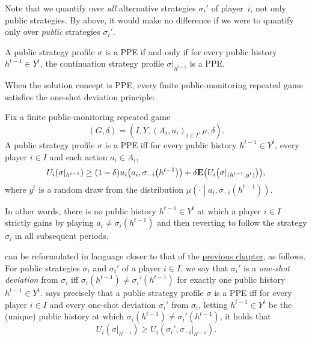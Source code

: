 Note that we quantify over \emph{all} alternative strategies $\sigma_i'$ of player~$i$, not only public strategies. By  above, it would make no difference if we were to quantify only over \emph{public} strategies $\sigma_i'$.

\begin{observation}
	\label{observation:ppe_conts}
	A public strategy profile $\sigma$ is a PPE if and only if for every public history $h^{t-1} \in Y^t$, the continuation strategy profile $\sigma|_{h^{t-1}}$ is a PPE.
\end{observation}

When the solution concept is PPE, every finite public-monitoring repeated game satisfies the one-shot deviation principle:

\begin{proposition}
	\label{proposition:ppe_osdp}
	Fix a finite public-monitoring repeated game
	\begin{equation*}
		(G,\delta) = \left( I, Y, (A_i, u_i)_{i \in I}, \mu, \delta \right) .
	\end{equation*}
	A public strategy profile $\sigma$ is a PPE iff for every public history $h^{t-1} \in Y^t$, every player $i \in I$ and each action $a_i \in A_i$,
	\begin{equation*}
		U_i\left( \sigma|_{h^{t-1}} \right)
		\geq (1-\delta) u_i\left( a_i, \sigma_{-i}\left( h^{t-1} \right) \right)
		+ \delta \E\left( U_i\left( \sigma|_{\left(h^{t-1},y^t\right)} \right) \right) ,
	\end{equation*}
	where $y^t$ is a random draw from the distribution $\mu\left( \cdot \middle| a_i, \sigma_{-i}\left( h^{t-1} \right) \right)$.
\end{proposition}

In other words, there is no public history $h^{t-1} \in Y^t$ at which a player $i \in I$ strictly gains by playing $a_i \neq \sigma_i\left( h^{t-1} \right)$ and then reverting to follow the strategy $\sigma_i$ in all subsequent periods.

 can be reformulated in language closer to that of the \hyperref[ch_osdp]{previous chapter}, as follows. For public strategies $\sigma_i$ and $\sigma_i'$ of a player $i \in I$, we say that $\sigma_i'$ is a \emph{one-shot deviation} from $\sigma_i$ iff $\sigma_i\left( h^{t-1} \right) \neq \sigma_i'\left( h^{t-1} \right)$ for exactly one public history $h^{t-1} \in Y^t$.  says precisely that a public strategy profile $\sigma$ is a PPE iff for every player $i \in I$ and every one-shot deviation $\sigma_i'$ from $\sigma_i$, letting $h^{t-1} \in Y^t$ be the (unique) public history at which $\sigma_i\left( h^{t-1} \right) \neq \sigma_i'\left( h^{t-1} \right)$, it holds that
%
\begin{equation*}
	U_i\left( \sigma|_{h^{t-1}} \right)
	\geq U_i\left( \sigma_i', \sigma_{-i}|_{h^{t-1}} \right) .
\end{equation*}

